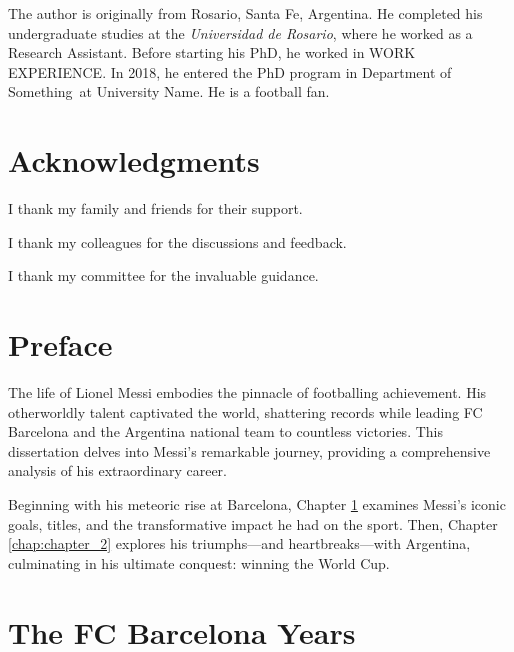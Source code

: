 \documentclass{report}
\newcommand{\university}{University Name}
\newcommand{\department}{Department of Something}
\begin{document}
The author is originally from Rosario, Santa Fe, Argentina.
He completed his undergraduate studies at the \textit{Universidad de Rosario},
where he worked as a Research Assistant.
Before starting his PhD, he worked in WORK EXPERIENCE.
In 2018, he entered the PhD program in \department\ at \university.
He is a football fan.

\chapter*{Acknowledgments}

I thank my family and friends for their support.

I thank my colleagues for the discussions and feedback.

I thank my committee for the invaluable guidance.

\chapter*{Preface}

The life of Lionel Messi embodies the pinnacle of footballing achievement. 
His otherworldly talent captivated the world, shattering records while leading 
FC Barcelona and the Argentina national team to countless victories.
This dissertation delves into Messi's remarkable journey, providing a 
comprehensive analysis of his extraordinary career.

Beginning with his meteoric rise at Barcelona, Chapter \ref{chap:chapter_1} 
examines Messi's iconic goals, titles, and the transformative impact he had 
on the sport.
Then, Chapter \ref{chap:chapter_2} explores his triumphs---and heartbreaks---with 
Argentina, culminating in his ultimate conquest: winning the World Cup.

\setcounter{tocdepth}{1} %

\tableofcontents
\listoftables
\listoffigures


\clearpage

\setcounter{page}{1}
\doublespacing

\setcounter{section}{0}%

\chapter{The FC Barcelona Years}
\label{chap:chapter_1}
\end{document}
